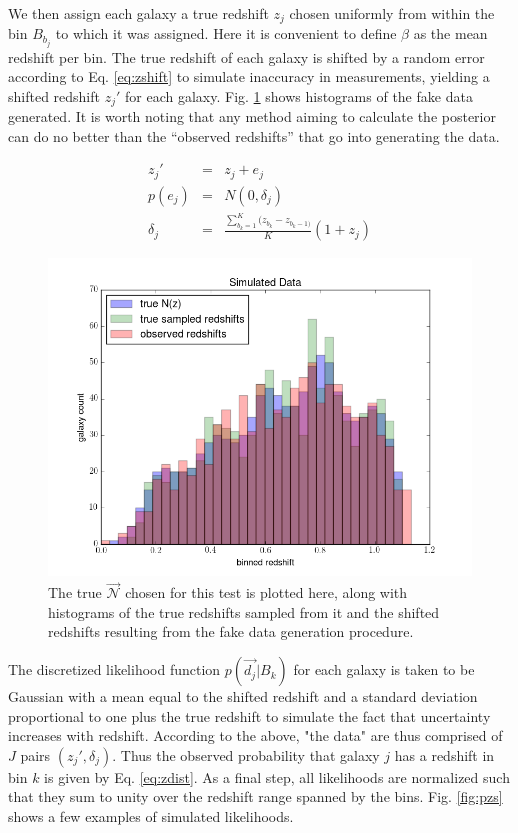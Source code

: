 \documentclass[12pt, onecolumn]{emulateapj}
\begin{document}
We then assign each galaxy a true redshift $z_{j}$ chosen uniformly from within the bin $B_{b_{j}}$ to which it was assigned.  Here it is convenient to define $\beta$ as the mean redshift per bin.  The true redshift of each galaxy is shifted by a random error according to Eq. \ref{eq:zshift} to simulate inaccuracy in measurements, yielding a shifted redshift $z_{j}'$ for each galaxy.  Fig. \ref{fig:samples} shows histograms of the fake data generated.  It is worth noting that any method aiming to calculate the posterior can do no better than the ``observed redshifts'' that go into generating the data.

\begin{mathletters}
\begin{eqnarray}
\label{eq:zshift}
z_{j}' &=& z_{j}+e_{j}\\
p(e_{j}) &=& N(0,\delta_{j})\nonumber\\
\delta_{j} &=& \frac{\sum_{b_{k}=1}^{K}(z_{b_{k}}-z_{b_{k}-1)}}{K}(1+z_{j})\nonumber
\end{eqnarray}
\end{mathletters}

\begin{figure}
\label{fig:samples}
\includegraphics[scale=0.5]{simdata.png}
\caption{The true $\vec{\mathcal{N}}$ chosen for this test is plotted here, along with histograms of the true redshifts sampled from it and the shifted redshifts resulting from the fake data generation procedure.}
\end{figure}

The discretized likelihood function $p(\vec{d_{j}}|B_{k})$ for each galaxy is taken to be Gaussian with a mean equal to the shifted redshift and a standard deviation proportional to one plus the true redshift to simulate the fact that uncertainty increases with redshift.  According to the above, "the data" are thus comprised of $J$ pairs $(z_{j}',\delta_{j})$.  Thus the observed probability that galaxy $j$ has a redshift in bin $k$ is given by Eq. \ref{eq:zdist}.  As a final step, all likelihoods are normalized such that they sum to unity over the redshift range spanned by the bins.  Fig. \ref{fig:pzs} shows a few examples of simulated likelihoods.
\end{document}
